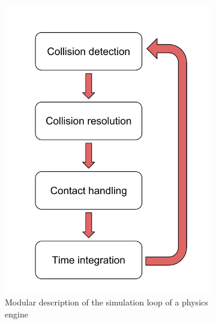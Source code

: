 \begin{figure}[htp]
\center
\begin{subfigure}[b]{0.45\textwidth}
	\includegraphics[width=\textwidth]{figures/star_simul_loop2}
	\caption[Simulation loop]{Modular description of the simulation loop of a physics engine}
	\label{fig:star_simul_loop}
\end{subfigure}
\hfill
\begin{subfigure}[b]{0.47\textwidth}

\end{subfigure}
\end{figure}
